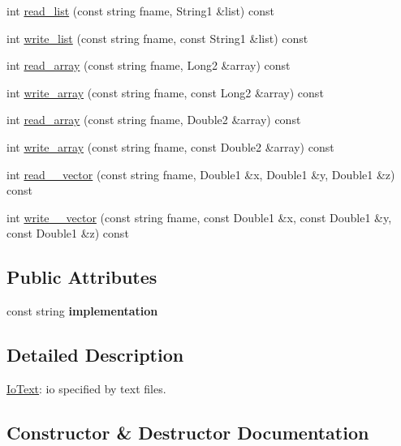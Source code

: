 \begin{DoxyCompactItemize}
\item 
int \mbox{\hyperlink{structIoPython_a924ffac9eca892940d1dd91cd97a6be3}{read\+\_\+list}} (const string fname, String1 \&list) const
\item 
int \mbox{\hyperlink{structIoPython_aa8657964ce2051a963614d6f54578a7b}{write\+\_\+list}} (const string fname, const String1 \&list) const
\item 
int \mbox{\hyperlink{structIoPython_ad37c12b459683395fdcb63be94352c60}{read\+\_\+array}} (const string fname, Long2 \&array) const
\item 
int \mbox{\hyperlink{structIoPython_aaa819900c69a39611ac7e2e46598f6bb}{write\+\_\+array}} (const string fname, const Long2 \&array) const
\item 
int \mbox{\hyperlink{structIoPython_a0000f072ed7e6744c222f215701c219e}{read\+\_\+array}} (const string fname, Double2 \&array) const
\item 
int \mbox{\hyperlink{structIoPython_a2c5827350f08648843d06734b38276c3}{write\+\_\+array}} (const string fname, const Double2 \&array) const
\item 
int \mbox{\hyperlink{structIoPython_a7f9224586baa4e837e55e3f3b1eac85d}{read\+\_\+\_\+vector}} (const string fname, Double1 \&x, Double1 \&y, Double1 \&z) const
\item 
int \mbox{\hyperlink{structIoPython_a90a56f09b1e1873274b20e42386a420f}{write\+\_\+\_\+vector}} (const string fname, const Double1 \&x, const Double1 \&y, const Double1 \&z) const
\end{DoxyCompactItemize}
\subsection*{Public Attributes}
\begin{DoxyCompactItemize}
\item 
\mbox{\label{structIoPython_ad0a9ece7b694753a335fe99792741cba}} 
const string {\bfseries implementation}
\end{DoxyCompactItemize}


\subsection{Detailed Description}
\mbox{\hyperlink{structIoText}{Io\+Text}}\+: io specified by text files. 

\subsection{Constructor \& Destructor Documentation}
\mbox{\label{structIoPython_aecfbf8a5a148d102ab584493c7b32477}} 
